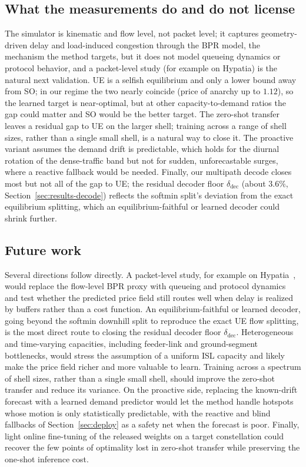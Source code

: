\documentclass[journal]{IEEEtran}
\begin{document}
\subsection{What the measurements do and do not license}
The simulator is kinematic and flow level, not packet level; it captures
geometry-driven delay and load-induced congestion through the BPR model, the mechanism
the method targets, but it does not model queueing dynamics or protocol behavior, and a
packet-level study (for example on Hypatia) is the natural next validation. UE is a
selfish equilibrium and only a lower bound away from SO; in our regime the two nearly
coincide (price of anarchy up to $1.12$), so the learned target is near-optimal, but at
other capacity-to-demand ratios the gap could matter and SO would be the better target.
The zero-shot transfer leaves a residual gap to UE on the larger shell; training across
a range of shell sizes, rather than a single small shell, is a natural way to close it.
The proactive variant assumes the demand drift is predictable, which holds for the
diurnal rotation of the dense-traffic band but not for sudden, unforecastable surges,
where a reactive fallback would be needed. Finally, our multipath decode closes most but
not all of the gap to UE; the residual decoder floor $\delta_{\mathrm{dec}}$ (about $3.6\%$,
Section~\ref{sec:results-decode}) reflects the softmin split's deviation from the exact
equilibrium splitting, which an equilibrium-faithful or learned decoder could shrink
further.

\subsection{Future work}\label{sec:future}
Several directions follow directly. A packet-level study, for example on
Hypatia~\cite{hypatia}, would replace the flow-level BPR proxy with queueing and protocol
dynamics and test whether the predicted price field still routes well when delay is
realized by buffers rather than a cost function. An equilibrium-faithful or learned decoder,
going beyond the softmin downhill split to reproduce the exact UE flow splitting, is the most
direct route to closing the residual decoder floor $\delta_{\mathrm{dec}}$.
Heterogeneous and time-varying capacities, including feeder-link and ground-segment
bottlenecks, would stress the assumption of a uniform ISL capacity and likely make the price
field richer and more valuable to learn. Training across a spectrum of shell sizes, rather
than a single small shell, should improve the zero-shot transfer and reduce its variance. On
the proactive side, replacing the known-drift forecast with a learned demand predictor would
let the method handle hotspots whose motion is only statistically predictable, with the
reactive and blind fallbacks of Section~\ref{sec:deploy} as a safety net when the forecast
is poor. Finally, light online fine-tuning of the released weights on a target constellation
could recover the few points of optimality lost in zero-shot transfer while preserving the
one-shot inference cost.
\end{document}
